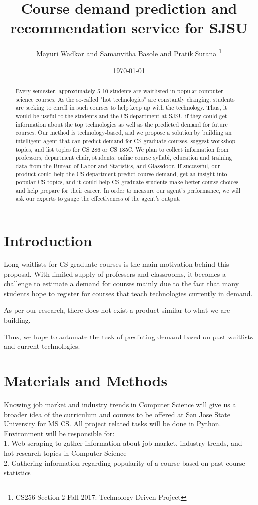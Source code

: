 \documentclass{article}
\title{Course demand prediction and recommendation service for SJSU}
\author{Mayuri Wadkar and Samanvitha Basole and Pratik Surana
\thanks{CS256 Section 2 Fall 2017: Technology Driven Project}}
\date{\today}
\begin{document}
\maketitle
\begin{abstract}
Every semester, approximately 5-10 students are waitlisted in popular computer science courses. As the so-called "hot technologies" are constantly changing, students are seeking to enroll in such courses to help keep up with the technology. Thus, it would be useful to the students and the CS department at SJSU if they could get information about the top technologies as well as the predicted demand for future courses. Our method is technology-based, and we propose a solution by building an intelligent agent that can predict demand for CS graduate courses, suggest workshop topics, and list topics for CS 286 or CS 185C. We plan to collect information from professors, department chair, students, online course syllabi, education and training data from the Bureau of Labor and Statistics, and Glassdoor. If successful, our product could help the CS department predict course demand, get an insight into popular CS topics, and it could help CS graduate students make better course choices and help prepare for their career. In order to measure our agent's performance, we will ask our experts to gauge the effectiveness of the agent's output. 
\end{abstract}

\section{Introduction}

Long waitlists for CS graduate courses is the main motivation behind this proposal. With limited supply of professors and classrooms, it becomes a challenge to estimate a demand for courses mainly due to the fact that many students hope to register for courses that teach technologies currently in demand. 

As per our research, there does not exist a product similar to what we are building. 

Thus, we hope to automate the task of predicting demand based on past waitlists and current technologies. 


\section{Materials and Methods}
Knowing job market and industry trends in Computer Science will give us a broader idea of the curriculum and courses to be offered at San Jose State University for MS CS. All project related tasks will be done in Python. \\
Environment will be responsible for: \\
1. Web scraping to gather information about job market, industry trends, and hot research topics in Computer Science \cite{mitchell2015web}\\
2. Gathering information regarding popularity of a course based on past course statistics \cite{robert2009introduction} \\
\end{document}
